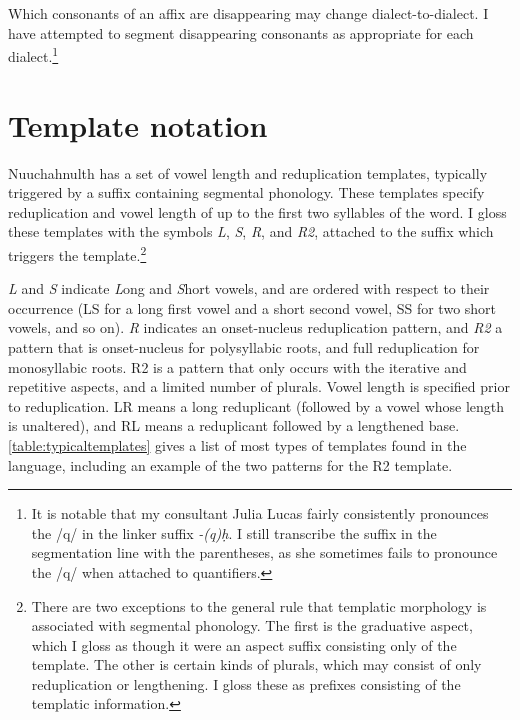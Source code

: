 
Which consonants of an affix are disappearing may change dialect-to-dialect. I have attempted to segment disappearing consonants as appropriate for each dialect.\footnote{It is notable that my consultant Julia Lucas fairly consistently pronounces the /q/ in the linker suffix \textit{-(q)ḥ}. I still transcribe the suffix in the segmentation line with the parentheses, as she sometimes fails to pronounce the /q/ when attached to quantifiers.}

\section{Template notation}

Nuuchahnulth has a set of vowel length and reduplication templates, typically triggered by a suffix containing segmental phonology. These templates specify reduplication and vowel length of up to the first two syllables of the word. I gloss these templates with the symbols \textit{L}, \textit{S}, \textit{R}, and \textit{R2}, attached to the suffix which triggers the template.\footnote{There are two exceptions to the general rule that templatic morphology is associated with segmental phonology. The first is the graduative aspect, which I gloss as though it were an aspect suffix consisting only of the template. The other is certain kinds of plurals, which may consist of only reduplication or lengthening. I gloss these as prefixes consisting of the templatic information.}

\textit{L} and \textit{S} indicate \textit{L}ong and \textit{S}hort vowels, and are ordered with respect to their occurrence (LS for a long first vowel and a short second vowel, SS for two short vowels, and so on). \textit{R} indicates an onset-nucleus reduplication pattern, and \textit{R2} a pattern that is onset-nucleus for polysyllabic roots, and full reduplication for monosyllabic roots. R2 is a pattern that only occurs with the iterative and repetitive aspects, and a limited number of plurals. Vowel length is specified prior to reduplication. LR means a long reduplicant (followed by a vowel whose length is unaltered), and RL means a reduplicant followed by a lengthened base. \cref{table:typicaltemplates} gives a list of most types of templates found in the language, including an example of the two patterns for the R2 template.

